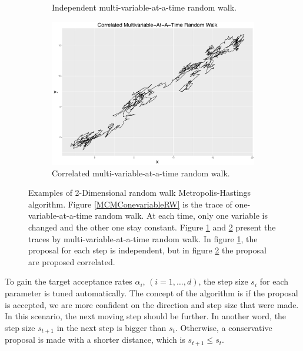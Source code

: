 \begin{figure}[h]
\begin{subfigure}[b]{0.32\textwidth}
    \caption{\footnotesize Independent multi-variable-at-a-time random walk.}\label{MCMCMultivariableRW}
\end{subfigure}
\begin{subfigure}[b]{0.32\textwidth}
     \includegraphics[width=\textwidth]{Chapters/05MCMCOU/plots/ggcorRW.pdf}   
    \caption{\footnotesize Correlated multi-variable-at-a-time random walk.}\label{MCMCCorrelatedRW}
\end{subfigure}
\caption{Examples of 2-Dimensional random walk Metropolis-Hastings algorithm. Figure \ref{MCMConevariableRW} is the trace of one-variable-at-a-time random walk. At each time, only one variable is changed and the other one stay constant. Figure \ref{MCMCMultivariableRW} and \ref{MCMCCorrelatedRW} present the traces by multi-variable-at-a-time random walk. In figure \ref{MCMCMultivariableRW}, the proposal for each step is independent, but in figure \ref{MCMCCorrelatedRW} the proposal are proposed correlated.}
\label{randomwalk}
\end{figure}

To gain the target acceptance rates $\alpha_i$, $(i = 1, \dots, d)$, the step size $s_i$ for each parameter is tuned automatically. The concept of the algorithm is if the proposal is accepted, we are more confident on the direction and step size that were made. In this scenario, the next moving step should be further. In another word, the step size $s_{t+1}$ in the next step is bigger than $s_t$. Otherwise, a conservative proposal is made with a shorter distance, which is $s_{t+1}\leq s_t$. 

